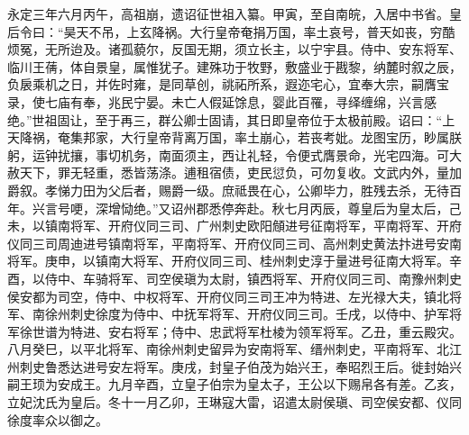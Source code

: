 \documentclass[]{article}
\begin{document}
永定三年六月丙午，高祖崩，遗诏征世祖入纂。甲寅，至自南皖，入居中书省。皇后令曰：``昊天不吊，上玄降祸。大行皇帝奄捐万国，率土哀号，普天如丧，穷酷烦冤，无所迨及。诸孤藐尔，反国无期，须立长主，以宁宇县。侍中、安东将军、临川王蒨，体自景皇，属惟犹子。建殊功于牧野，敷盛业于戡黎，纳麓时叙之辰，负扆乘机之日，并佐时雍，是同草创，祧祏所系，遐迩宅心，宜奉大宗，嗣膺宝录，使七庙有奉，兆民宁晏。未亡人假延馀息，婴此百罹，寻绎缠绵，兴言感绝。''世祖固让，至于再三，群公卿士固请，其日即皇帝位于太极前殿。诏曰：``上天降祸，奄集邦家，大行皇帝背离万国，率土崩心，若丧考妣。龙图宝历，眇属朕躬，运钟扰攘，事切机务，南面须主，西让礼轻，令便式膺景命，光宅四海。可大赦天下，罪无轻重，悉皆荡涤。逋租宿债，吏民愆负，可勿复收。文武内外，量加爵叙。孝悌力田为父后者，赐爵一级。庶祗畏在心，公卿毕力，胜残去杀，无待百年。兴言号哽，深增恸绝。''又诏州郡悉停奔赴。秋七月丙辰，尊皇后为皇太后，己未，以镇南将军、开府仪同三司、广州刺史欧阳頠进号征南将军，平南将军、开府仪同三司周迪进号镇南将军，平南将军、开府仪同三司、高州刺史黄法抃进号安南将军。庚申，以镇南大将军、开府仪同三司、桂州刺史淳于量进号征南大将军。辛酉，以侍中、车骑将军、司空侯瑱为太尉，镇西将军、开府仪同三司、南豫州刺史侯安都为司空，侍中、中权将军、开府仪同三司王冲为特进、左光禄大夫，镇北将军、南徐州刺史徐度为侍中、中抚军将军、开府仪同三司。壬戌，以侍中、护军将军徐世谱为特进、安右将军；侍中、忠武将军杜棱为领军将军。乙丑，重云殿灾。八月癸巳，以平北将军、南徐州刺史留异为安南将军、缙州刺史，平南将军、北江州刺史鲁悉达进号安左将军。庚戌，封皇子伯茂为始兴王，奉昭烈王后。徙封始兴嗣王顼为安成王。九月辛酉，立皇子伯宗为皇太子，王公以下赐帛各有差。乙亥，立妃沈氏为皇后。冬十一月乙卯，王琳寇大雷，诏遣太尉侯瑱、司空侯安都、仪同徐度率众以御之。
\end{document}
